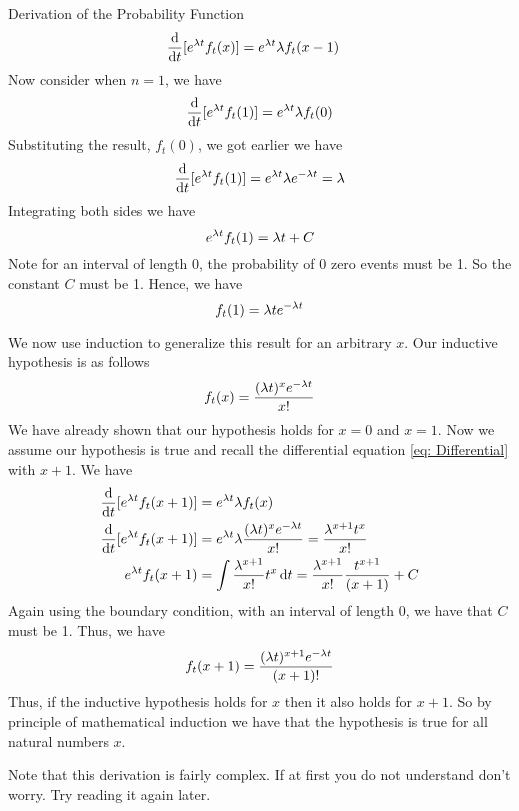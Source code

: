 \begin{theory}{Derivation of the Probability Function}
\begin{align}
    \frac{\operatorname{d}\!{}}{\operatorname{d}\!{t}} [e^{\lambda t} f_t(x)] &= e^{\lambda t} \lambda f_t(x-1) \label{eq: Differential}
\end{align}
Now consider when $n = 1$, we have
\[
    \frac{\operatorname{d}\!{}}{\operatorname{d}\!{t}} [e^{\lambda t} f_t(1)] = e^{\lambda t} \lambda f_t(0)
\]
Substituting the result, $f_t(0)$, we got earlier we have
\[
    \frac{\operatorname{d}\!{}}{\operatorname{d}\!{t}} [e^{\lambda t} f_t(1)] = e^{\lambda t} \lambda e^{-\lambda t} = \lambda  
\]
Integrating both sides we have
\[
    e^{\lambda t} f_t(1) = \lambda t + C
\]
Note for an interval of length 0, the probability of 0 zero events must be 1. So the constant $C$ must be 1. Hence, we have
\[
    f_t(1) = \lambda t e^{-\lambda t}
\]
\par\smallskip
We now use induction to generalize this result for an arbitrary $x$. Our inductive hypothesis is as follows
\[
    f_t(x) = \frac{(\lambda t)^x e^{-\lambda t}}{x!}
\]
We have already shown that our hypothesis holds for $x = 0$ and $x = 1$. Now we assume our hypothesis is true and recall the differential equation \eqref{eq: Differential} with $x+1$. We have
\begin{align*}
    \frac{\operatorname{d}\!{}}{\operatorname{d}\!{t}} [e^{\lambda t} f_t(x+1)] &= e^{\lambda t} \lambda f_t(x) \\
    \frac{\operatorname{d}\!{}}{\operatorname{d}\!{t}} [e^{\lambda t} f_t(x+1)] &= e^{\lambda t} \lambda \frac{(\lambda t)^x e^{-\lambda t}}{x!} 
    = \frac{\lambda^{x+1} t^x}{x!} \\
    e^{\lambda t} f_t(x+1) &= \int \frac{\lambda^{x+1}}{x!} t^x \operatorname{d}\!{t} 
    = \frac{\lambda^{x+1}}{x!}\frac{t^{x+1}}{(x+1)} + C
\end{align*}
Again using the boundary condition, with an interval of length 0, we have that $C$ must be 1. Thus, we have
\[
    f_t(x+1) = \frac{(\lambda t)^{x+1} e^{-\lambda t}}{(x+1)!}
\]
Thus, if the inductive hypothesis holds for $x$ then it also holds for $x+1$. So by principle of mathematical induction we have that the hypothesis is true for all natural numbers $x$. 
\end{theory}
\begin{info}
Note that this derivation is fairly complex. If at first you do not understand don't worry. Try reading it again later.
\end{info}

